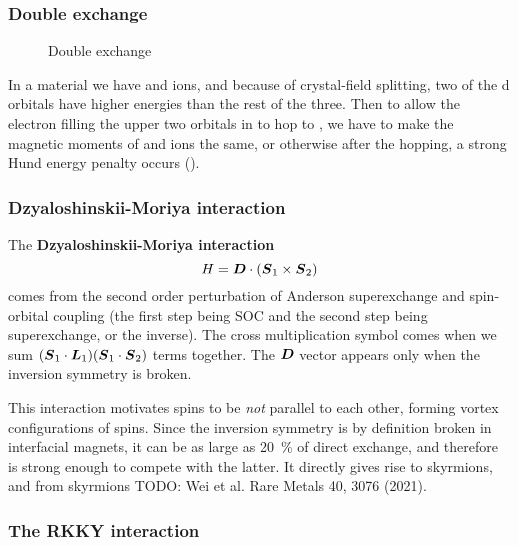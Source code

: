 \documentclass[hyperref, a4paper]{article}
\newcommand*{\concept}[1]{{\textbf{#1}}}
\begin{document}
\subsubsection{Double exchange}

\begin{figure}
    \centering
    
    \caption{Double exchange}
    \label{fig:double-exchange}
\end{figure}

In a material we have  and  ions,
and because of crystal-field splitting, 
two of the d orbitals have higher energies than the rest of the three. 
Then to allow the electron filling the upper two orbitals in 
to hop to ,
we have to make the magnetic moments of  and  ions the same, 
or otherwise after the hopping, 
a strong Hund energy penalty occurs
(). 

\subsubsection{Dzyaloshinskii-Moriya interaction}\label{sec:localized.itinerant-media.dm}

The \concept{Dzyaloshinskii-Moriya interaction} 
\begin{equation}
    H = \vb*{D} \cdot (\vb*{S}_1 \times \vb*{S}_2)
\end{equation}
comes from 
the second order perturbation 
of Anderson superexchange and spin-orbital coupling
(the first step being SOC and the second step being superexchange,
or the inverse). 
The cross multiplication symbol comes 
when we sum $(\vb*{S}_1 \cdot \vb*{L}_1) (\vb*{S}_1 \cdot \vb*{S}_2)$ terms together.
The $\vb*{D}$ vector appears only when the inversion symmetry is broken. 

This interaction motivates 
spins to be \emph{not} parallel to each other, 
forming vortex configurations of spins. 
Since the inversion symmetry is by definition broken 
in interfacial magnets, 
it can be as large as \SI{20}{\percent} of direct exchange,
and therefore is strong enough to compete with the latter. 
It directly gives rise to skyrmions, 
and from skyrmions TODO: Wei et al. Rare Metals 40, 3076 (2021).

\subsubsection{The RKKY interaction}
\end{document}
